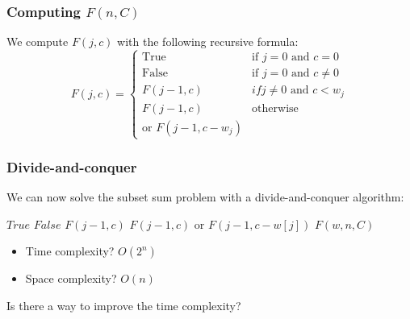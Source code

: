 \documentclass{beamer}
\begin{document}
\begin{frame}
  \frametitle{Computing $F(n, C)$}

  We compute $F(j, c)$ with the following recursive formula:
  \begin{displaymath}
    F(j, c) =
    \left\{
      \begin{array}{ll}
        \text{True} & \text{if $j = 0$ and $c = 0$} \\
        \text{False} & \text{if $j = 0$ and $c \neq 0$} \\
        F(j - 1, c) & if \text{$j \neq 0$ and $c < w_j$} \\
        F(j - 1, c) & \text{otherwise} \\
        \text{or } F(j - 1, c - w_j) &
      \end{array}
    \right.
  \end{displaymath}
\end{frame}

\begin{frame}
  \frametitle{Divide-and-conquer}

  \small
  We can now solve the subset sum problem with a divide-and-conquer algorithm:

  \begin{minipage}[t]{0.68\linewidth}
    \begin{algorithmic}
      \State\Return$True$
      \Else{}
      \State\Return$False$
      \EndIf
      \State\Return$F(j - 1, c)$
      \Else{}
      \State\Return$F(j - 1, c) \text{ or } F(j - 1, c - w[j])$
      \EndIf
      \EndFunction{}
      \State\Return{} $F(w, n, C)$
      \EndFunction{}
    \end{algorithmic}
  \end{minipage}
  \hfill
  \begin{minipage}[t]{0.28\linewidth}
    \begin{itemize}
      \item \pause Time complexity? \pause $O(2^n)$
      \item \pause Space complexity? \pause $O(n)$
    \end{itemize}
  \end{minipage}

  \bigskip

  \pause Is there a way to improve the time complexity?
\end{frame}
\end{document}
